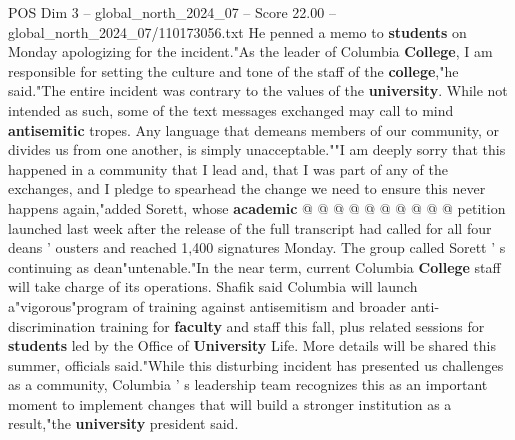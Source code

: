 \begin{textsample}{POS Dim 3 – global\_north\_2024\_07 – Score 22.00 – global\_north\_2024\_07/110173056.txt}
He penned a memo to \textbf{students} on Monday apologizing for the incident."As the leader of Columbia \textbf{College}, I am responsible for setting the culture and tone of the staff of the \textbf{college},"he said."The entire incident was contrary to the values of the \textbf{university}.
While not intended as such, some of the text messages exchanged may call to mind \textbf{antisemitic} tropes.
Any language that demeans members of our community, or divides us from one another, is simply unacceptable.""I am deeply sorry that this happened in a community that I lead and, that I was part of any of the exchanges, and I pledge to spearhead the change we need to ensure this never happens again,"added Sorett, whose \textbf{academic} @ @ @ @ @ @ @ @ @ @ petition launched last week after the release of the full transcript had called for all four deans ' ousters and reached 1,400 signatures Monday.
The group called Sorett ' s continuing as dean"untenable."In the near term, current Columbia \textbf{College} staff will take charge of its operations.
Shafik said Columbia will launch a"vigorous"program of training against antisemitism and broader anti-discrimination training for \textbf{faculty} and staff this fall, plus related sessions for \textbf{students} led by the Office of \textbf{University} Life.
More details will be shared this summer, officials said."While this disturbing incident has presented us challenges as a community, Columbia ' s leadership team recognizes this as an important moment to implement changes that will build a stronger institution as a result,"the \textbf{university} president said.

\end{textsample}
